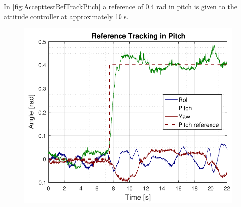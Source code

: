 In \autoref{fig:AccepttestRefTrackPitch} a reference of 0.4 rad in pitch is given to the attitude controller at approximately 10 s.
\begin{figure}[H]
    \includegraphics[scale=.7]{figures/AccepttestRefTrackPitch.pdf}
    \centering			
    \label{fig:AccepttestRefTrackPitch}
\end{figure}

